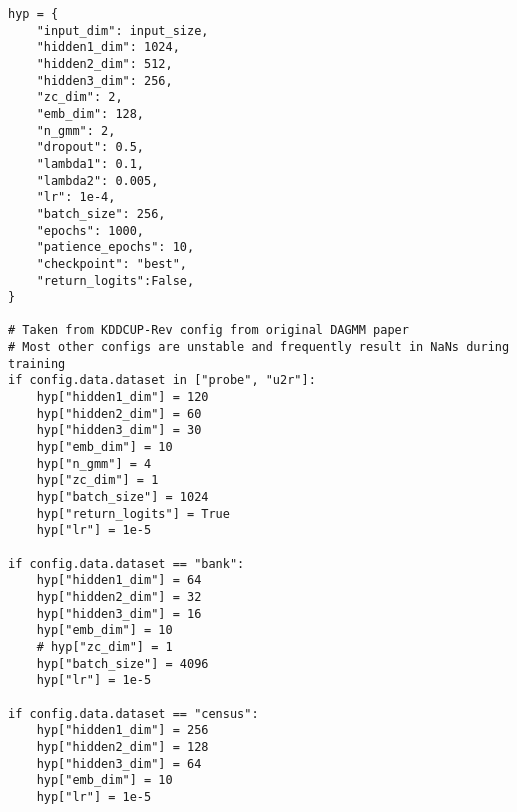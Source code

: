 \begin{verbatim}
hyp = {
    "input_dim": input_size,
    "hidden1_dim": 1024,
    "hidden2_dim": 512,
    "hidden3_dim": 256,
    "zc_dim": 2,
    "emb_dim": 128,
    "n_gmm": 2,
    "dropout": 0.5,
    "lambda1": 0.1,
    "lambda2": 0.005,
    "lr": 1e-4,
    "batch_size": 256,
    "epochs": 1000,
    "patience_epochs": 10,
    "checkpoint": "best",
    "return_logits":False,
}

# Taken from KDDCUP-Rev config from original DAGMM paper
# Most other configs are unstable and frequently result in NaNs during training
if config.data.dataset in ["probe", "u2r"]:
    hyp["hidden1_dim"] = 120
    hyp["hidden2_dim"] = 60
    hyp["hidden3_dim"] = 30
    hyp["emb_dim"] = 10
    hyp["n_gmm"] = 4
    hyp["zc_dim"] = 1
    hyp["batch_size"] = 1024
    hyp["return_logits"] = True
    hyp["lr"] = 1e-5

if config.data.dataset == "bank":
    hyp["hidden1_dim"] = 64
    hyp["hidden2_dim"] = 32
    hyp["hidden3_dim"] = 16
    hyp["emb_dim"] = 10
    # hyp["zc_dim"] = 1
    hyp["batch_size"] = 4096
    hyp["lr"] = 1e-5

if config.data.dataset == "census":
    hyp["hidden1_dim"] = 256
    hyp["hidden2_dim"] = 128
    hyp["hidden3_dim"] = 64
    hyp["emb_dim"] = 10
    hyp["lr"] = 1e-5

\end{verbatim}